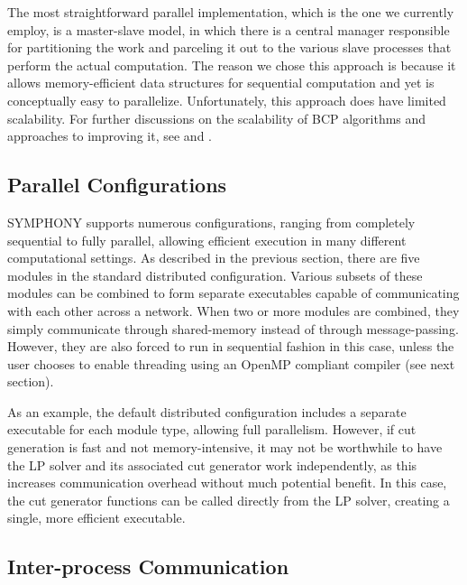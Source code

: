 The most straightforward parallel implementation, which is the one we
currently employ, is a master-slave model, in which there is a central
manager responsible for partitioning the work and parceling it out to
the various slave processes that perform the actual computation. The
reason we chose this approach is because it allows memory-efficient
data structures for sequential computation and yet is conceptually
easy to parallelize. Unfortunately, this approach does have limited
scalability. For further discussions on the scalability of BCP algorithms and
approaches to improving it, see \cite{symphony1} and \cite{ALPS2}.


\subsection{Parallel Configurations}

SYMPHONY supports numerous configurations, ranging from completely
sequential to fully parallel, allowing efficient execution in many
different computational settings. As described in the previous
section, there are five modules in the standard distributed
configuration. Various subsets of these modules can be
combined to form separate executables capable of communicating
with each other across a network. When two or more modules are combined,
they simply communicate through shared-memory instead of through
message-passing. However, they are also forced to run in sequential
fashion in this case, unless the user chooses to enable threading
using an OpenMP compliant compiler (see next section). 

As an example, the default distributed configuration includes a
separate executable for each module type, allowing full parallelism.
However, if cut generation is fast and not memory-intensive,
it may not be worthwhile to have the LP solver and its associated cut
generator work independently, as this increases communication
overhead without much potential benefit. In this case, the cut
generator functions can be called directly from the LP solver,
creating a single, more efficient executable.

\subsection{Inter-process Communication}

